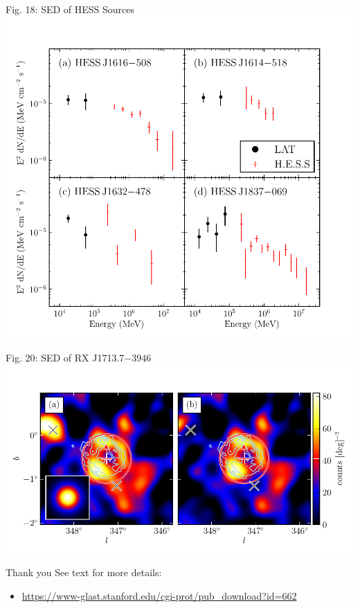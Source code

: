 \documentclass[12pt]{beamer}
\begin{document}
\begin{frame}{Fig. 18: SED of HESS Sources}
  \includegraphics[scale=0.5]{plots/hess_seds_color.pdf}
\end{frame}

\begin{frame}{Fig. 20: SED of RX J1713.7$-$3946}
  \includegraphics[scale=0.5]{plots/source_RX_J1713_7-3946_color.pdf}
\end{frame}



\begin{frame}{Thank you}
  See text for more details:
  \begin{itemize}
    \item
  \url{https://www-glast.stanford.edu/cgi-prot/pub_download?id=662}
  \end{itemize}

\end{frame}
\end{document}
